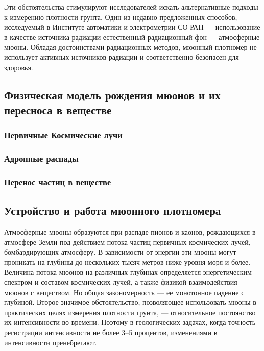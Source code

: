 \documentclass[a4paper,10pt]{article}
\begin{document}
Эти обстоятельства стимулируют исследователей искать альтернативные подходы к измерению плотности грунта. 
Один из недавно предложенных способов, исследуемый в Институте автоматики и электрометрии СО РАН ---
использование в качестве источника радиации естественный радиационный фон --- атмосферные мюоны. 
Обладая достоинствами радиационных методов, мюонный плотномер 
не использует активных источников радиации и соответственно безопасен для здоровья. 

\subsection{Физическая модель рождения мюонов и их пересноса в веществе}

\subsubsection{Первичные Космические лучи}

\subsubsection{Адронные распады}

\subsubsection{Перенос частиц в веществе} %


\subsection{Устройство и работа мюонного плотномера}

Атмосферные мюоны образуются при распаде пионов и каонов, 
рождающихся в атмосфере Земли под действием потока частиц 
первичных космических лучей, бомбардирующих атмосферу. 
В зависимости от энергии эти мюоны могут проникать на глубины 
до нескольких тысяч метров ниже уровня моря и более. Величина 
потока мюонов на различных глубинах определяется 
энергетическим спектром и составом космических лучей, 
а также физикой взаимодействия мюонов с веществом. Но общая 
закономерность --- ее монотонное падение с глубиной. 
Второе значимое обстоятельство, позволяющее использовать мюоны 
в практических целях измерения плотности грунта, --- относительное 
постоянство их интенсивности во времени. Поэтому 
в геологических задачах, когда точность регистрации 
интенсивности не более 3--5 процентов,  
изменениями в интенсивности пренебрегают.
\end{document}
